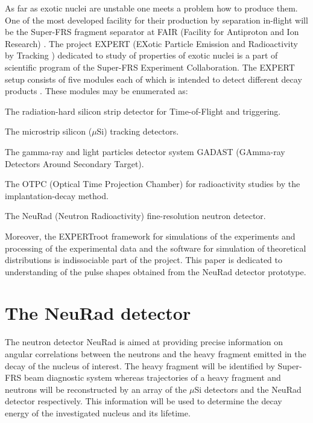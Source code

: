 \documentclass{webofc}
\begin{document}
As far as exotic nuclei are unstable one meets a problem how to produce them.
One of the most developed facility for their production by separation in-flight will be the Super-FRS fragment separator at FAIR (Facility for Antiproton and Ion Research) \cite{diplom}. The project EXPERT (EXotic Particle Emission and Radioactivity by Tracking \cite{IMexpert}) dedicated to study of properties of exotic nuclei is a part of scientific program of the Super-FRS Experiment Collaboration. The EXPERT setup consists of five modules each of which is intended to detect different decay products \cite{tdr}.
These modules may be enumerated as:
\begin{inparaenum}[(i)]
	\item The radiation-hard silicon strip detector for Time-of-Flight and triggering.
	\item The microstrip silicon ($\mu$Si) tracking detectors.
	\item The gamma-ray and light particles detector system GADAST (GAmma-ray Detectors Around Secondary Target).
	\item The OTPC (Optical Time Projection Chamber) for radioactivity studies by the implantation-decay method.
	\item The NeuRad (Neutron Radioactivity) fine-resolution neutron detector.
\end{inparaenum}

Moreover, the EXPERTroot framework \cite{er} for simulations of the experiments and processing of the experimental data and the software for simulation of theoretical distributions is indissociable part of the project.
This paper is dedicated to understanding of the pulse shapes obtained from the NeuRad detector prototype. 

\section{The NeuRad detector}

The neutron detector NeuRad is aimed at providing precise information on angular correlations between the neutrons and the heavy fragment emitted in the decay of the nucleus of interest. The heavy fragment will be identified by Super-FRS beam diagnostic system whereas trajectories of a heavy fragment and neutrons will be reconstructed by an array of the $\mu$Si detectors and the NeuRad detector respectively. 
This information will be used to determine the decay energy of the investigated nucleus and its lifetime.
\end{document}
